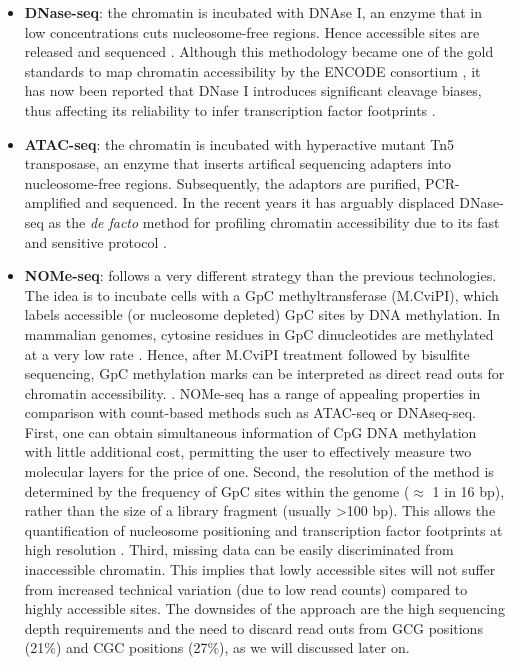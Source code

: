 \begin{itemize}

	\item \textbf{DNase-seq}: the chromatin is incubated with DNAse I, an enzyme that in low concentrations cuts nucleosome-free regions. Hence accessible sites are released and sequenced \cite{Song2010}. Although this methodology became one of the gold standards to map chromatin accessibility by the ENCODE consortium \cite{ENCODE2012,Thurman2012}, it has now been reported that DNase I introduces significant cleavage biases, thus affecting its reliability to infer transcription factor footprints \cite{He2013}.

	\item \textbf{ATAC-seq}: the chromatin is incubated with hyperactive mutant Tn5 transposase, an enzyme that inserts artifical sequencing adapters into nucleosome-free regions. Subsequently, the adaptors are purified, PCR-amplified  and sequenced. In the recent years it has arguably displaced DNase-seq as the \textit{de facto} method for profiling chromatin accessibility due to its fast and sensitive protocol \cite{Buenrostro2015b,Tsompana2014,Nordstrom2019}.

	\item \textbf{NOMe-seq}: follows a very different strategy than the previous technologies. The idea is to incubate cells with a GpC methyltransferase (M.CviPI), which labels accessible (or nucleosome depleted) GpC sites by DNA methylation. In mammalian genomes, cytosine residues in GpC dinucleotides are methylated at a very low rate \cite{Kilgore2007}. Hence, after M.CviPI treatment followed by bisulfite sequencing, GpC methylation marks can be interpreted as direct read outs for chromatin accessibility. \cite{Kelly2012}. NOMe-seq has a range of appealing properties in comparison with count-based methods such as ATAC-seq or DNAseq-seq. First, one can obtain simultaneous information of CpG DNA methylation with little additional cost, permitting the user to effectively measure two molecular layers for the price of one. Second, the resolution of the method is determined by the frequency of GpC sites within the genome ($\approx$ 1 in 16 bp), rather than the size of a library fragment (usually >100 bp). This allows the quantification of nucleosome positioning and transcription factor footprints at high resolution \cite{Kelly2012,Pott2016,Nordstrom2019}. Third, missing data can be easily discriminated from inaccessible chromatin. This implies that lowly accessible sites will not suffer from increased technical variation (due to low read counts) compared to highly accessible sites.
	The downsides of the approach are the high sequencing depth requirements and the need to discard read outs from GCG positions (21\%) and CGC positions (27\%), as we will discussed later on.	

\end{itemize}


